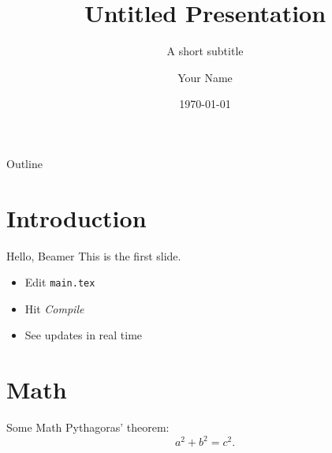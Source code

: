\documentclass{beamer}
\title{Untitled Presentation}
\subtitle{A short subtitle}
\author{Your Name}
\date{\today}
\begin{document}
\maketitle

\begin{frame}{Outline}
  \tableofcontents
\end{frame}

\section{Introduction}

\begin{frame}{Hello, Beamer}
  This is the first slide.
  \begin{itemize}
    \item Edit \texttt{main.tex}
    \item Hit \emph{Compile}
    \item See updates in real time
  \end{itemize}
\end{frame}

\section{Math}

\begin{frame}{Some Math}
  Pythagoras' theorem:
  \[
    a^{2} + b^{2} = c^{2}.
  \]
\end{frame}
\end{document}
